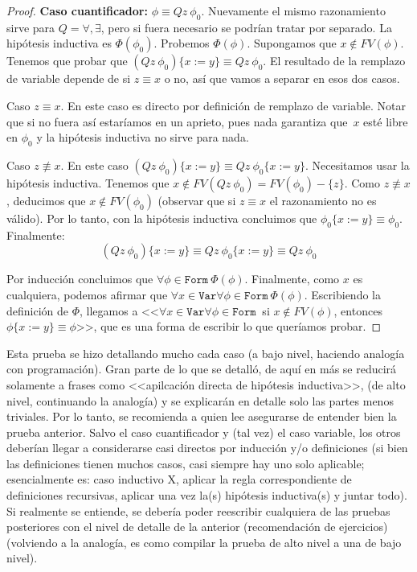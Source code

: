 \documentclass[a4paper, 12pt]{report}
\theoremstyle{definition}
\begin{document}
\begin{proof}
	\textbf{Caso cuantificador:} $\phi\equiv Qz~\phi_0$. Nuevamente el mismo razonamiento sirve para $Q=\forall,\exists$, pero si fuera necesario se podrían tratar por separado. La hipótesis inductiva es $\Phi(\phi_0)$. Probemos $\Phi(\phi)$. Supongamos que $x\not\in FV(\phi)$. Tenemos que probar que $(Qz~\phi_0)\{x:=y\}\equiv Qz~\phi_0$. El resultado de la remplazo de variable depende de si $z\equiv x$ o no, así que vamos a separar en esos dos casos.
	
	Caso $z\equiv x$. En este caso es directo por definición de remplazo de variable. Notar que si no fuera así estaríamos en un aprieto, pues nada garantiza que~$x$ esté libre en $\phi_0$ y la hipótesis inductiva no sirve para nada.
	
	Caso $z\not\equiv x$. En este caso $(Qz~\phi_0)\{x:=y\}\equiv Qz~\phi_0\{x:=y\}$. Necesitamos usar la hipótesis inductiva. Tenemos que $x\not\in FV(Qz~\phi_0)=FV(\phi_0)-\{z\}$. Como $z\not\equiv x$, deducimos que $x\not\in FV(\phi_0)$ (observar que si $z\equiv x$ el razonamiento no es válido). Por lo tanto, con la hipótesis inductiva concluimos que $\phi_0\{x:=y\}\equiv\phi_0$. Finalmente:
	$$ (Qz~\phi_0)\{x:=y\}\equiv Qz~\phi_0\{x:=y\}\equiv Qz~\phi_0
	$$
	
	Por inducción concluimos que $\forall \phi\in\mathtt{Form}~\Phi(\phi)$. Finalmente, como $x$ es cualquiera, podemos afirmar que $\forall x\in\mathtt{Var}\forall \phi\in\mathtt{Form}~\Phi(\phi)$. Escribiendo la definición de $\Phi$, llegamos a <<$\forall x\in\mathtt{Var}\forall \phi\in\mathtt{Form}~$ si $x\not\in FV(\phi)$, entonces $\phi\{x:=y\}\equiv\phi$>>, que es una forma de escribir lo que queríamos probar.
\end{proof}
Esta prueba se hizo detallando mucho cada caso (a bajo nivel, haciendo analogía con programación). Gran parte de lo que se detalló, de aquí en más se reducirá solamente a frases como <<apilcación directa de hipótesis inductiva>>,  (de alto nivel, continuando la analogía) y se explicarán en detalle solo las partes menos triviales. Por lo tanto, se recomienda a quien lee asegurarse de entender bien la prueba anterior. Salvo el caso cuantificador y (tal vez) el caso variable, los otros deberían llegar a considerarse casi directos por inducción y/o definiciones (si bien las definiciones tienen muchos casos, casi siempre hay uno solo aplicable; esencialmente es: caso inductivo X, aplicar la regla correspondiente de definiciones recursivas, aplicar una vez la(s) hipótesis inductiva(s) y juntar todo). Si realmente se entiende, se debería poder reescribir cualquiera de las pruebas posteriores con el nivel de detalle de la anterior (recomendación de ejercicios) (volviendo a la analogía, es como compilar la prueba de alto nivel a una de bajo nivel).
\end{document}
